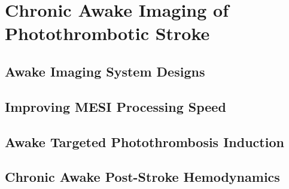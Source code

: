 
\chapter{Chronic Awake Imaging of Photothrombotic Stroke} \label{Chapter_5}

\blindtext



\section{Awake Imaging System Designs}

\blindtext



\section{Improving MESI Processing Speed}

\blindtext



\section{Awake Targeted Photothrombosis Induction}

\blindtext



\section{Chronic Awake Post-Stroke Hemodynamics}

